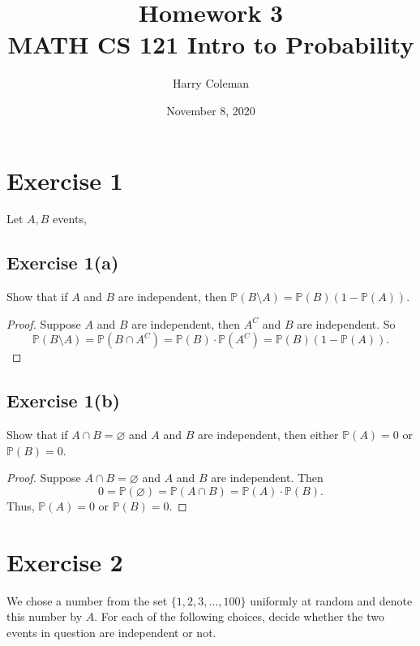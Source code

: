 \documentclass[12pt]{article}
\newenvironment{problem}
    {\begin{lrbox}{\mybox}\begin{minipage}{\textwidth-10pt}}
    {\end{minipage}\end{lrbox}\framebox[\textwidth]{\usebox{\mybox}}}
\let\emptyset\varnothing
\renewcommand{\P}{\mathbb{P}}
\begin{document}
 
\title{Homework 3\\
    \large MATH CS 121 Intro to Probability
}
\author{Harry Coleman}
\date{November 8, 2020}
\maketitle

\section*{Exercise 1}
\begin{problem}
    Let $A, B$ events,
\end{problem}

\subsection*{Exercise 1(a)}
\begin{problem}
    Show that if $A$ and $B$ are independent, then $\P(B\setminus A) = \P(B)(1-\P(A))$.
\end{problem}

\begin{proof}
    Suppose $A$ and $B$ are independent, then $A^C$ and $B$ are independent. So
    \[\P(B\setminus A) = \P(B\cap A^C) = \P(B)\cdot \P(A^C) = \P(B)(1-\P(A)).\]
    
\end{proof}

\subsection*{Exercise 1(b)}
\begin{problem}
    Show that if $A\cap B = \emptyset$ and $A$ and $B$ are independent, then either $\P(A) = 0$ or $\P(B) = 0$.
\end{problem}

\begin{proof}
    Suppose $A\cap B = \emptyset$ and $A$ and $B$ are independent. Then
    \[0 = \P(\emptyset) = \P(A\cap B) = \P(A) \cdot \P(B).\]
    Thus, $\P(A)=0$ or $\P(B) = 0$.
    
    
\end{proof}

\newpage
\section*{Exercise 2}
\begin{problem}
    We chose a number from the set $\{1,2,3,\dots,100\}$ uniformly at random and denote this number by $A$. For each of the following choices, decide whether the two events in question are independent or not.
\end{problem}
\end{document}
